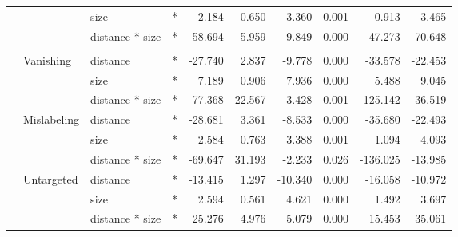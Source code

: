 \documentclass[
]{article}
\begin{document}
\begin{longtable}[t]{llllrrrrrr}
\cmidrule{3-10}\nopagebreak
\hspace{1em} &  & size & * & 2.184 & 0.650 & 3.360 & 0.001 & 0.913 & 3.465\\
\cmidrule{3-10}\nopagebreak
\hspace{1em} &  & distance * size & * & 58.694 & 5.959 & 9.849 & 0.000 & 47.273 & 70.648\\
\cmidrule{1-10}\pagebreak[0]
\addlinespace[0.3em]
\multicolumn{10}{l}{\textbf{Cascade R-CNN}}\\
\hspace{1em} & Vanishing & distance & * & -27.740 & 2.837 & -9.778 & 0.000 & -33.578 & -22.453\\
\cmidrule{3-10}\nopagebreak
\hspace{1em} &  & size & * & 7.189 & 0.906 & 7.936 & 0.000 & 5.488 & 9.045\\
\cmidrule{3-10}\nopagebreak
\hspace{1em} &  & distance * size & * & -77.368 & 22.567 & -3.428 & 0.001 & -125.142 & -36.519\\
\cmidrule{2-10}\nopagebreak
\hspace{1em} & Mislabeling & distance & * & -28.681 & 3.361 & -8.533 & 0.000 & -35.680 & -22.493\\
\cmidrule{3-10}\nopagebreak
\hspace{1em} &  & size & * & 2.584 & 0.763 & 3.388 & 0.001 & 1.094 & 4.093\\
\cmidrule{3-10}\nopagebreak
\hspace{1em} &  & distance * size & * & -69.647 & 31.193 & -2.233 & 0.026 & -136.025 & -13.985\\
\cmidrule{2-10}\nopagebreak
\hspace{1em} & Untargeted & distance & * & -13.415 & 1.297 & -10.340 & 0.000 & -16.058 & -10.972\\
\cmidrule{3-10}\nopagebreak
\hspace{1em} &  & size & * & 2.594 & 0.561 & 4.621 & 0.000 & 1.492 & 3.697\\
\cmidrule{3-10}\nopagebreak
\hspace{1em} &  & distance * size & * & 25.276 & 4.976 & 5.079 & 0.000 & 15.453 & 35.061\\
\bottomrule
\end{longtable}
\endgroup{}
\end{document}
